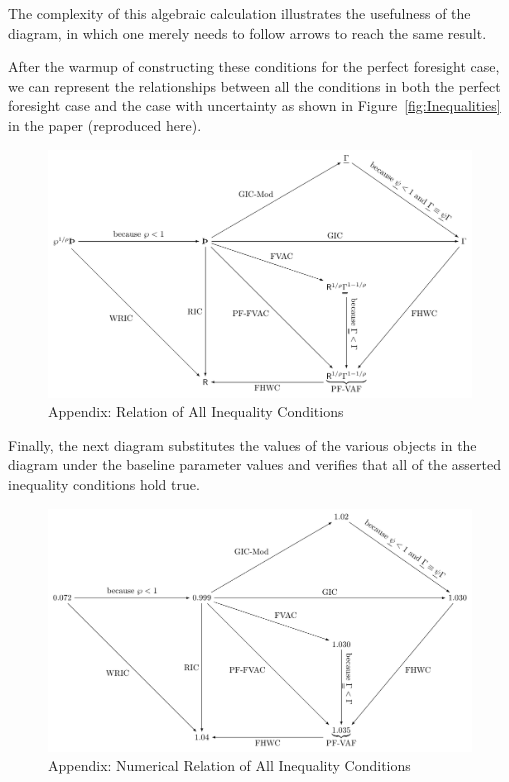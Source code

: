 \documentclass[\econtexRoot/BufferStockTheory]{subfiles}
\begin{document}
The complexity of this algebraic calculation illustrates the usefulness of the diagram, in which one merely needs to follow arrows to reach the same result.

After the warmup of constructing these conditions for the perfect foresight case, we can represent the relationships between all the conditions in both the perfect foresight case and the case with uncertainty as shown in Figure~\ref{fig:Inequalities} in the paper (reproduced here).

\begin{figure}[ht]
  \centerline{
    \includegraphics[width=6in]{Figures/Inequalities}
  }
  \caption{Appendix: Relation of All Inequality Conditions}\label{fig:InequalitiesApp}
\end{figure}

Finally, the next diagram substitutes the values of the various objects in the diagram under the baseline parameter values and verifies that all of the asserted inequality conditions hold true.
\begin{figure}[ht]
  \centerline{
    \includegraphics[width=6in]{Figures/Inequalities-numer}
  }
  \caption{Appendix: Numerical Relation of All Inequality Conditions}\label{fig:InequalitiesAppNumer}
\end{figure}


\end{document}
